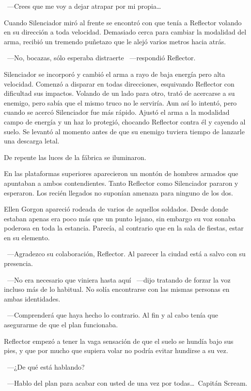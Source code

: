 ~---Crees que me voy a dejar atrapar por mi propia\dots

Cuando Silenciador miró al frente se encontró con que tenía a Reflector volando en su dirección a toda velocidad. Demasiado cerca para cambiar la modalidad del arma, recibió un tremendo puñetazo que le alejó varios metros hacia atrás.

~---No, bocazas, sólo esperaba distraerte ~---respondió Reflector.

Silenciador se incorporó y cambió el arma a rayo de baja energía pero alta velocidad. Comenzó a disparar en todas direcciones, esquivando Reflector con dificultad sus impactos. Volando de un lado para otro, trató de acercarse a su enemigo, pero sabía que el mismo truco no le serviría. Aun así lo intentó, pero cuando se acercó Silenciador fue más rápido. Ajustó el arma a la modalidad campo de energía y un haz lo protegió, chocando Reflector contra él y cayendo al suelo. Se levantó al momento antes de que su enemigo tuviera tiempo de lanzarle una descarga letal.

De repente las luces de la fábrica se iluminaron.

En las plataformas superiores aparecieron un montón de hombres armados que apuntaban a ambos contendientes. Tanto Reflector como Silenciador pararon y esperaron. Los recién llegados no suponían amenaza para ninguno de los dos.

Ellen Gorgon apareció rodeada de varios de aquellos soldados. Desde donde estaban apenas era poco más que un punto lejano, sin embargo su voz sonaba poderosa en toda la estancia. Parecía, al contrario que en la sala de fiestas, estar en su elemento.

~---Agradezco su colaboración, Reflector. Al parecer la ciudad está a salvo con su presencia.

~---No era necesario que viniera hasta aquí ~---dijo tratando de forzar la voz incluso más de lo habitual. No solía encontrarse con las mismas personas en ambas identidades.

~---Comprenderá que haya hecho lo contrario. Al fin y al cabo tenía que asegurarme de que el plan funcionaba.

Reflector empezó a tener la vaga sensación de que el suelo se hundía bajo sus pies, y que por mucho que supiera volar no podría evitar hundirse a su vez.

~---¿De qué está hablando?

~---Hablo del plan para acabar con usted de una vez por todas\dots\ Capitán Scream.

